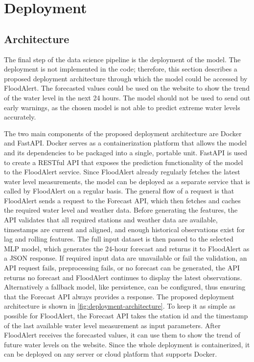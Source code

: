 \section{Deployment}
\subsection{Architecture}
The final step of the data science pipeline is the deployment of the model. The deployment is not implemented in the code; therefore, this section describes a proposed deployment architecture through which the model could be accessed by FloodAlert. The forecasted values could be used on the website to show the trend of the water level in the next 24 hours. The model should not be used to send out early warnings, as the chosen model is not able to predict extreme water levels accurately.

The two main components of the proposed deployment architecture are Docker and FastAPI. Docker serves as a containerization platform that allows the model and its dependencies to be packaged into a single, portable unit. FastAPI is used to create a RESTful API that exposes the prediction functionality of the model to the FloodAlert service. Since FloodAlert already regularly fetches the latest water level measurements, the model can be deployed as a separate service that is called by FloodAlert on a regular basis. The general flow of a request is that FloodAlert sends a request to the Forecast API, which then fetches and caches the required water level and weather data. Before generating the features, the API validates that all required stations and weather data are available, timestamps are current and aligned, and enough historical observations exist for lag and rolling features. The full input dataset is then passed to the selected \ac{MLP} model, which generates the 24-hour forecast and returns it to FloodAlert as a JSON response. If required input data are unavailable or fail the validation, an API request fails, preprocessing fails, or no forecast can be generated, the API returns no forecast and FloodAlert continues to display the latest observations. Alternatively a fallback model, like persistence, can be configured, thus ensuring that the Forecast API always provides a response. The proposed deployment architecture is shown in \autoref{fig:deployment-architecture}. To keep it as simple as possible for FloodAlert, the Forecast API takes the station id and the timestamp of the last available water level measurement as input parameters. After FloodAlert receives the forecasted values, it can use them to show the trend of future water levels on the website. Since the whole deployment is containerized, it can be deployed on any server or cloud platform that supports Docker.


